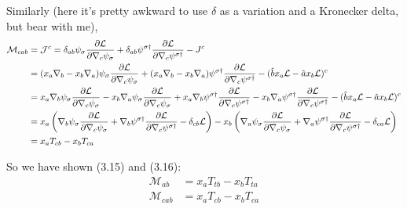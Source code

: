 Similarly (here it's pretty awkward to use $\delta$ as a variation and a Kronecker delta, but bear with me),
\begin{align*}
    \mathcal{M}_{cab} &= \mathcal{J}^c = \delta_{ab}\psi_\sigma \frac{\partial \mathcal{L}}{\partial \nabla_c \psi_\sigma} + \delta_{ab}\psi^{\sigma\dagger} \frac{\partial \mathcal{L}}{\partial \nabla_c \psi^{\sigma\dagger}} - J^c \\
    &= (x_a\nabla_b - x_b\nabla_a)\psi_\sigma \frac{\partial \mathcal{L}}{\partial \nabla_c \psi_\sigma} + (x_a\nabla_b - x_b\nabla_a)\psi^{\sigma\dagger} \frac{\partial \mathcal{L}}{\partial \nabla_c \psi^{\sigma\dagger}} - (\hat{b}x_a\mathcal{L} - \hat{a}x_b\mathcal{L})^c \\
    &= x_a\nabla_b \psi_\sigma \frac{\partial \mathcal{L}}{\partial \nabla_c \psi_\sigma} 
    - x_b\nabla_a\psi_\sigma \frac{\partial \mathcal{L}}{\partial \nabla_c \psi_\sigma} 
    + x_a\nabla_b\psi^{\sigma\dagger} \frac{\partial \mathcal{L}}{\partial \nabla_c \psi^{\sigma\dagger}} 
    - x_b\nabla_a\psi^{\sigma\dagger} \frac{\partial \mathcal{L}}{\partial \nabla_c \psi^{\sigma\dagger}} 
    - (\hat{b}x_a\mathcal{L} - \hat{a}x_b\mathcal{L})^c \\
    &= x_a\left(\nabla_b \psi_\sigma \frac{\partial \mathcal{L}}{\partial \nabla_c \psi_\sigma}
    +\nabla_b\psi^{\sigma\dagger} \frac{\partial \mathcal{L}}{\partial \nabla_c \psi^{\sigma\dagger}}
    - \delta_{cb}\mathcal{L}\right) 
    - x_b\left(\nabla_a\psi_\sigma \frac{\partial \mathcal{L}}{\partial \nabla_c \psi_\sigma}
    + \nabla_a\psi^{\sigma\dagger} \frac{\partial \mathcal{L}}{\partial \nabla_c \psi^{\sigma\dagger}}
    - \delta_{ca}\mathcal{L} \right) \\
    &= x_a T_{cb} - x_b T_{ca} \\
\end{align*}


So we have shown (3.15) and (3.16):
\begin{align*}
    \mathcal{M}_{ab} &= x_a T_{tb} - x_b T_{ta}\\
    \mathcal{M}_{cab} &= x_a T_{cb} - x_b T_{ca}\\
\end{align*}


